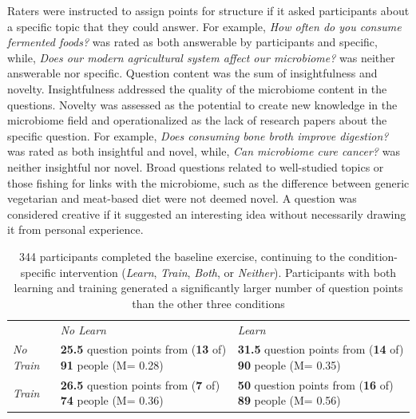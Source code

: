 Raters were instructed to assign points for structure if it asked participants about a specific topic that they could answer. For example, \textit{How often do you consume fermented foods?} was rated as both answerable by participants and specific, while, \textit{Does our modern agricultural system affect our microbiome?} was neither answerable nor specific. Question content was the sum of insightfulness and novelty. Insightfulness addressed the quality of the microbiome content in the questions. Novelty was assessed as the potential to create new knowledge in the microbiome field and operationalized as the lack of research papers about the specific question. For example, \textit{Does consuming bone broth improve digestion?} was rated as both insightful and novel, while, \textit{Can microbiome cure cancer?} was neither insightful nor novel. Broad questions related to well-studied topics or those fishing for links with the microbiome, such as the difference between generic vegetarian and meat-based diet were not deemed novel. A question was considered creative if it suggested an interesting idea without necessarily drawing it from personal experience. 

\vspace{0.25in}
\begin{table}[!ht]
\caption[Participants with both learning and training
generated a significantly larger number of question points]
{344 participants completed the baseline exercise, continuing
to the condition-specific intervention (\textit{Learn}, \textit{Train},
\textit{Both}, or \textit{Neither}). Participants with both learning and training
generated a significantly larger number of question points
than the other three conditions}

\vspace{-0.25in}
\begin{center}
\renewcommand{\arraystretch}{1.5} %
\begin{tabular}{p{1.5in}p{2in}p{2in}}
\hline
				& \textit{No Learn} 		& \textit{Learn} \\
\textit{No Train} 	& \textbf{25.5} question points from (\textbf{13} of) \textbf{91} people (M= 0.28) 
				& \textbf{31.5} question points from (\textbf{14} of) \textbf{90} people (M= 0.35) \\

\textit{Train} 	& \textbf{26.5} question points from (\textbf{7} of) \textbf{74} people (M= 0.36)
			& \textbf{50} question points from (\textbf{16} of) \textbf{89} people (M= 0.56) \\
\hline
\end{tabular}
\end{center}
\label{d-tab:results1}
\end{table}

